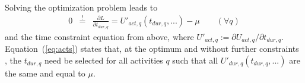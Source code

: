 
Solving the optimization problem leads to
\begin{eqnarray}
0 & \stackrel!= & \frac{\partial L}{\partial t_{dur,q}} = U'_{act,q}(t_{dur,q},...) - \mu 
%
\qquad (\forall q)
\label{eq:acts}
\end{eqnarray}
and the time constraint equation from above, where $U'_{act,q} := \partial U_{act,q}/\partial t_{dur,q}$.
%
Equation~(\ref{eq:acts}) states that, at the optimum and without further constraints%
%
%
, the $t_{dur,q}$ need be selected for all activities $q$ such that all $U'_{dur,q}(t_{dur,q},...)$ are the same and equal to $\mu$.

